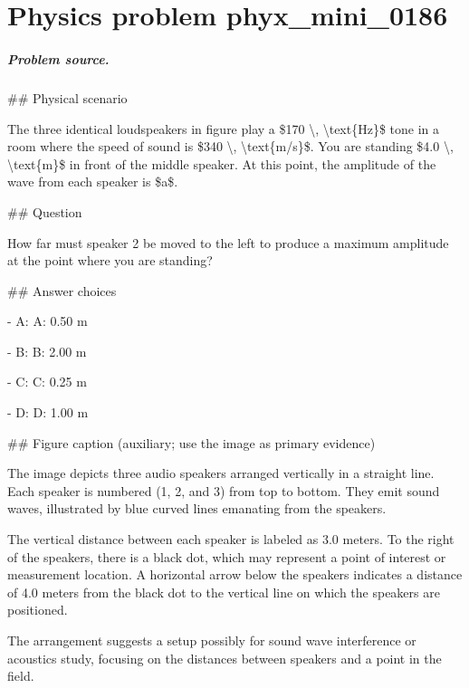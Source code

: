 
\chapter{Physics problem phyx\_mini\_0186}
\label{ch:PhyXMiniProblems_problem_phyx_mini_0186}

\paragraph{Problem source.}
\#\# Physical scenario

The three identical loudspeakers in figure play a \$170 \textbackslash{}, \textbackslash{}text\{Hz\}\$ tone in a room where the speed of sound is \$340 \textbackslash{}, \textbackslash{}text\{m/s\}\$. You are standing \$4.0 \textbackslash{}, \textbackslash{}text\{m\}\$ in front of the middle speaker. At this point, the amplitude of the wave from each speaker is \$a\$.

\#\# Question

How far must speaker 2 be moved to the left to produce a maximum amplitude at the point where you are standing?

\#\# Answer choices

- A: A: 0.50 m

- B: B: 2.00 m

- C: C: 0.25 m

- D: D: 1.00 m

\#\# Figure caption (auxiliary; use the image as primary evidence)

The image depicts three audio speakers arranged vertically in a straight line. Each speaker is numbered (1, 2, and 3) from top to bottom. They emit sound waves, illustrated by blue curved lines emanating from the speakers.

The vertical distance between each speaker is labeled as 3.0 meters. To the right of the speakers, there is a black dot, which may represent a point of interest or measurement location. A horizontal arrow below the speakers indicates a distance of 4.0 meters from the black dot to the vertical line on which the speakers are positioned.

The arrangement suggests a setup possibly for sound wave interference or acoustics study, focusing on the distances between speakers and a point in the field.

